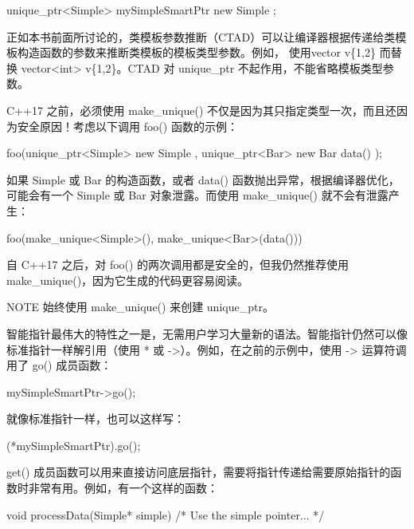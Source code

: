 \begin{cpp}
unique_ptr<Simple> mySimpleSmartPtr { new Simple{} };
\end{cpp}

正如本书前面所讨论的，类模板参数推断（CTAD）可以让编译器根据传递给类模板构造函数的参数来推断类模板的模板类型参数。例如， 使用vector v\{1,2\} 而替换 vector<int> v\{1,2\}。CTAD 对 unique\_ptr 不起作用，不能省略模板类型参数。

C++17 之前，必须使用 make\_unique() 不仅是因为其只指定类型一次，而且还因为安全原因！考虑以下调用 foo() 函数的示例：

\begin{cpp}
foo(unique_ptr<Simple> { new Simple{} }, unique_ptr<Bar> { new Bar { data() } });
\end{cpp}

如果 Simple 或 Bar 的构造函数，或者 data() 函数抛出异常，根据编译器优化，可能会有一个 Simple 或 Bar 对象泄露。而使用 make\_unique() 就不会有泄露产生：

\begin{cpp}
foo(make_unique<Simple>(), make_unique<Bar>(data()))
\end{cpp}

自 C++17 之后，对 foo() 的两次调用都是安全的，但我仍然推荐使用 make\_unique()，因为它生成的代码更容易阅读。

\begin{myNotic}{NOTE}
始终使用 make\_unique() 来创建 unique\_ptr。
\end{myNotic}


智能指针最伟大的特性之一是，无需用户学习大量新的语法。智能指针仍然可以像标准指针一样解引用（使用 * 或 ->）。例如，在之前的示例中，使用 -> 运算符调用了 go() 成员函数：

\begin{cpp}
mySimpleSmartPtr->go();
\end{cpp}

就像标准指针一样，也可以这样写：

\begin{cpp}
(*mySimpleSmartPtr).go();
\end{cpp}

get() 成员函数可以用来直接访问底层指针，需要将指针传递给需要原始指针的函数时非常有用。例如，有一个这样的函数：

\begin{cpp}
void processData(Simple* simple) { /* Use the simple pointer... */ }
\end{cpp}

